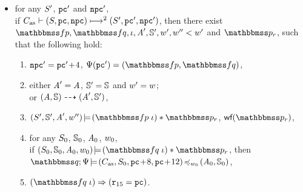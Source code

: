 \begin{definition}
\begin{enumerate}[1.]
\begin{itemize}
                \item for any {\em $\state'$}, {\em $\pc'$} and {\em $\npc'$}, \\
                if
                {\em $\multilptrans{\asmimp}{2}{(\state, \pc, \npc)}{(\state', \pc', \npc')}$},
                then there exist $\relspecpre, \relspecpost, \lgvl,
                \primcom', \hpstate', \word', \word'' < \word'$
                and $\relastP_r$, such that the following hold:
                \begin{enumerate}[(1)]
                    \item {\em $\npc' = \pc'\!+\!4$},
                        {\em $\Cspec(\pc') = (\relspecpre, \relspecpost)$},

                    \item either $\primcom' = \primcom$,
                    $\hpstate' = \hpstate$ and $\word' = \word$; \\
                    or
                    $\primTrans{(\primcom, \hpstate)}
                        {(\primcom', \hpstate')}$,

                    \item
                        $\asrtmodel{(\state', \hpstate', \primcom', \word'')}
                            {(\relspecpre \; \lgvl) * \relastP_r}$,
                        {\em $\wfFrm(\relastP_r)$},

                    \item
                    for any $\state_0$, $\hpstate_0$, $\primcom_0$, $\word_0$, \\
                    if $\asrtmodel{(\state_0, \hpstate_0, \primcom_0, \word_0)}
                        {(\relspecpost \; \lgvl) * \relastP_r}$,
                    then \\
                    {\em $\simInsSeq{\relastQ}{\Cspec}{(\asmimp, \state_0, \pc\!+\!8, \pc\!+\!12)}
                        {\word_0}{(\primcom_0, \hpstate_0)}$},

                    \item
                    {\em $(\relspecpost \; \lgvl)
                    \Rightarrow (\reg{15} = \pc)$}.
                \end{enumerate}
            \end{itemize}


\end{enumerate}
\end{definition}
